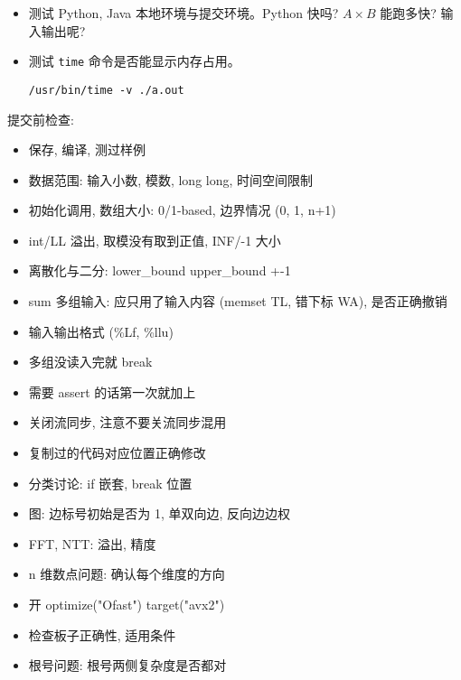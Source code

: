 \begin{small}
\begin{itemize}[leftmargin=1mm]
\begin{verbatim}
\end{verbatim}
    \item 测试 Python, Java 本地环境与提交环境。Python 快吗? $A\times B$ 能跑多快? 输入输出呢? 
    \item 测试 \texttt{time} 命令是否能显示内存占用。
\begin{verbatim}
/usr/bin/time -v ./a.out
\end{verbatim}
\end{itemize}
提交前检查: 
\begin{itemize}[leftmargin=1mm]
    \setlength{\itemsep}{0pt}
    \setlength{\parskip}{0.5pt}
\item 保存, 编译, 测过样例
\item 数据范围: 输入小数, 模数, long long, 时间空间限制
\item 初始化调用, 数组大小: 0/1-based, 边界情况 (0, 1, n+1)
\item int/LL 溢出, 取模没有取到正值, INF/-1 大小
\item 离散化与二分: lower\_bound upper\_bound +-1
\item sum 多组输入: 应只用了输入内容 (memset TL, 错下标 WA), 是否正确撤销
\item 输入输出格式 (\%Lf, \%llu)
\item 多组没读入完就 break
\item 需要 assert 的话第一次就加上
\item 关闭流同步, 注意不要关流同步混用
\item 复制过的代码对应位置正确修改
\item 分类讨论: if 嵌套, break 位置
\item 图: 边标号初始是否为 1, 单双向边, 反向边边权
\item FFT, NTT: 溢出, 精度
\item n 维数点问题: 确认每个维度的方向
\item 开 optimize("Ofast") target("avx2")
\item 检查板子正确性, 适用条件
\item 根号问题: 根号两侧复杂度是否都对
\end{itemize}
\end{small}
